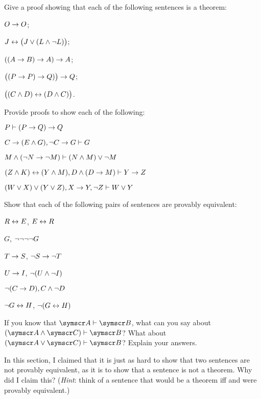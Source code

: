 \practiceproblems
\problempart
Give a proof showing that each of the following sentences is a theorem:
\begin{earg}
\item $O \rightarrow O$;
\item $J \leftrightarrow \bigl(J\vee (L\wedge\neg L) \bigr)$;
\item $((A \rightarrow B) \rightarrow A) \rightarrow A$;
\item $\bigl((P \rightarrow P) \rightarrow Q)\bigr) \rightarrow Q$;
\item $\bigl((C \wedge D) \leftrightarrow (D \wedge C)\bigr)$.
\end{earg}

\newpage\problempart
Provide proofs to show each of the following:
\begin{earg}
\item $P \vdash (P  \rightarrow Q) \rightarrow Q$
\item $C\rightarrow(E\wedge G), \neg C \rightarrow G \vdash G$
\item $M \wedge (\neg N \rightarrow \neg M) \vdash (N \wedge M) \vee \neg M$
\item $(Z\wedge K)\leftrightarrow(Y\wedge M), D\wedge(D\rightarrow M) \vdash Y\rightarrow Z$
\item $(W \vee X) \vee (Y \vee Z), X\rightarrow Y, \neg Z \vdash W\vee Y$
\end{earg}

\problempart
Show that each of the following pairs of sentences are provably equivalent:
\begin{earg}
\item $R \leftrightarrow E$, $E \leftrightarrow R$
\item $G$, $\neg\neg\neg\neg G$
\item $T\rightarrow S$, $\neg S \rightarrow \neg T$
\item $U \rightarrow I$, $\neg(U \wedge \neg I)$
\item $\neg (C \rightarrow D), C \wedge \neg D$
\item $\neg G \leftrightarrow H$, $\neg(G \leftrightarrow H)$ 
\end{earg}

\problempart
If you know that $\meta{A}\proves\meta{B}$, what can you say about $(\meta{A}\eand\meta{C})\proves\meta{B}$? What about $(\meta{A}\eor\meta{C})\proves\meta{B}$? Explain your answers.


\problempart In this section, I claimed that it is just as hard to show that two sentences are not provably equivalent, as it is to show that a sentence is not a theorem. Why did I claim this? (\emph{Hint}: think of a sentence that would be a theorem iff  and  were provably equivalent.)

